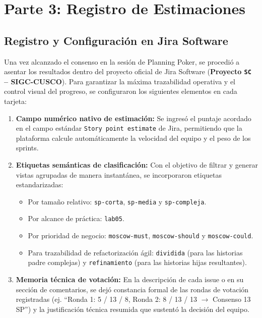 \section{Parte 3: Registro de Estimaciones}

\subsection{Registro y Configuración en Jira Software}

Una vez alcanzado el consenso en la sesión de Planning Poker, se procedió a asentar los resultados dentro del proyecto oficial de Jira Software (\textbf{Proyecto \texttt{SC} -- SIGC-CUSCO}). Para garantizar la máxima trazabilidad operativa y el control visual del progreso, se configuraron los siguientes elementos en cada tarjeta:

\begin{enumerate}
    \item \textbf{Campo numérico nativo de estimación:} Se ingresó el puntaje acordado en el campo estándar \texttt{Story point estimate} de Jira, permitiendo que la plataforma calcule automáticamente la velocidad del equipo y el peso de los sprints.
    \item \textbf{Etiquetas semánticas de clasificación:} Con el objetivo de filtrar y generar vistas agrupadas de manera instantánea, se incorporaron etiquetas estandarizadas:
    \begin{itemize}
        \item Por tamaño relativo: \texttt{sp-corta}, \texttt{sp-media} y \texttt{sp-compleja}.
        \item Por alcance de práctica: \texttt{lab05}.
        \item Por prioridad de negocio: \texttt{moscow-must}, \texttt{moscow-should} y \texttt{moscow-could}.
        \item Para trazabilidad de refactorización ágil: \texttt{dividida} (para las historias padre complejas) y \texttt{refinamiento} (para las historias hijas resultantes).
    \end{itemize}
    \item \textbf{Memoria técnica de votación:} En la descripción de cada issue o en su sección de comentarios, se dejó constancia formal de las rondas de votación registradas (ej. \enquote{Ronda 1: 5 / 13 / 8, Ronda 2: 8 / 13 / 13 $\rightarrow$ Consenso 13 SP}) y la justificación técnica resumida que sustentó la decisión del equipo.
\end{enumerate}

